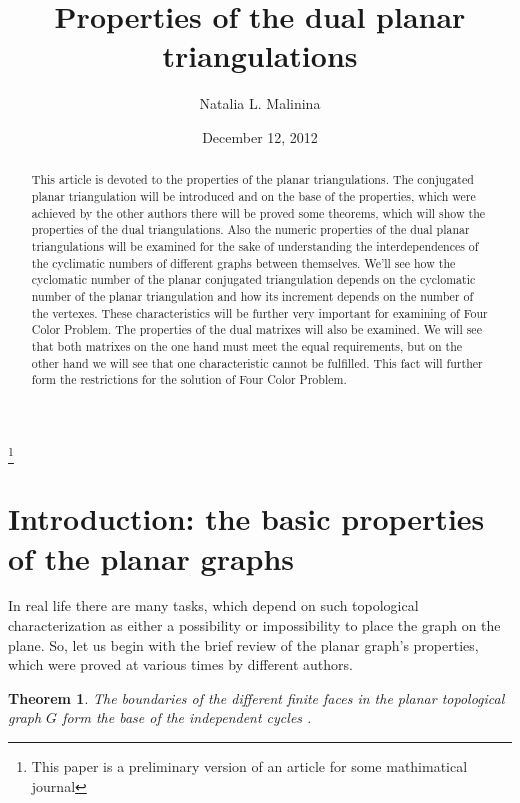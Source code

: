 \documentclass{amsart}
\newtheorem{theorem}{Theorem}
\theoremstyle{plain}
\numberwithin{equation}{section}
\begin{document}
\title[On the solution of Four Color Problem]{Properties of the dual planar triangulations}
\author{Natalia L. Malinina}
\thanks{This paper is a preliminary version of an article for some mathimatical journal}

\date{December 12, 2012}
 

\begin{abstract}
This article is devoted to the properties of the planar triangulations. The conjugated planar triangulation will be introduced and on the base of the properties, which were achieved by the other authors there will be proved some theorems, which will show the properties of the dual triangulations. Also the numeric properties of the dual planar triangulations will be examined for the sake of understanding the interdependences of the cyclimatic numbers of different graphs between themselves. We'll see how the cyclomatic number of the planar conjugated triangulation depends on the cyclomatic number of the planar triangulation and how its increment depends on the number of the vertexes. These characteristics will be further very important for examining of Four Color Problem. The properties of the dual matrixes will also be examined. We will see that both matrixes on the one hand must meet the equal requirements, but on the other hand we will see that one characteristic cannot be fulfilled. This fact will further form the restrictions for the solution of Four Color Problem.

\end{abstract}
\maketitle

\section {Introduction: the basic properties of the planar graphs}
 
In real life there are many tasks, which depend on such topological characterization as either a possibility or impossibility to place the graph on the plane. So, let us begin with the brief review of the planar graph's properties, which were proved at various times by different authors.

\begin {theorem}
The boundaries of the different finite faces in the planar topological graph $G$ form the base of the independent cycles \cite {Berge}.
\end{theorem}
\end{document}
